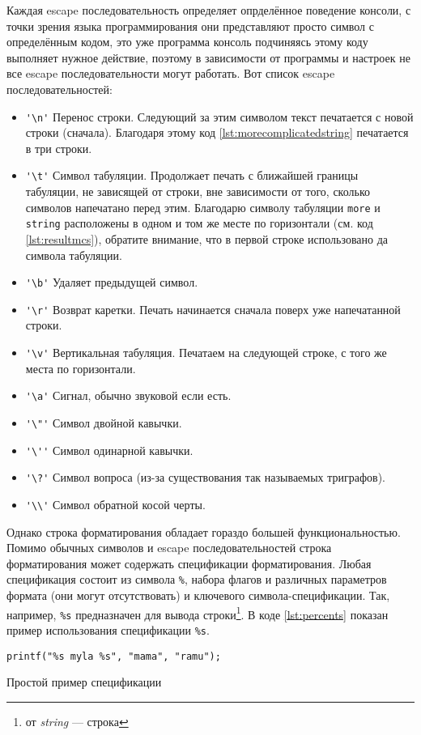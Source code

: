 \documentclass[12pt]{article}
\begin{document}
Каждая escape последовательность определяет опрделённое поведение консоли, с точки зрения языка программирования они представляют просто символ с определённым кодом, это уже программа консоль подчиняясь этому коду выполняет нужное действие, поэтому в зависимости от программы и настроек не все escape последовательности могут работать. Вот список escape последовательностей:
\begin{itemize}
 \item \verb|'\n'| Перенос строки. Следующий за этим символом текст печатается с новой строки (сначала). Благодаря этому код \ref{lst:morecomplicatedstring} печатается в три строки.
 \item \verb|'\t'| Символ табуляции. Продолжает печать с ближайшей границы табуляции, не зависящей от строки, вне зависимости от того, сколько символов напечатано перед этим. Благодарю символу табуляции \verb|more| и \verb|string| расположены в одном и том же месте по горизонтали (см. код \ref{lst:resultmcs}), обратите внимание, что в первой строке использовано да символа табуляции.
 \item \verb|'\b'| Удаляет предыдущей символ.
 \item \verb|'\r'| Возврат каретки. Печать начинается сначала поверх уже напечатанной строки.
 \item \verb|'\v'| Вертикальная табуляция. Печатаем на следующей строке, с того же места по горизонтали.
 \item \verb|'\a'| Сигнал, обычно звуковой если есть.
 \item \verb|'\"'| Символ двойной кавычки.
 \item \verb|'\''| Символ одинарной кавычки.
 \item \verb|'\?'| Символ вопроса (из-за существования так называемых триграфов).
 \item \verb|'\\'| Символ обратной косой черты.
\end{itemize}

Однако строка форматирования обладает гораздо большей функциональностью. Помимо обычных символов и escape последовательностей строка форматирования может содержать спецификации форматирования. Любая спецификация состоит из символа \verb|%|, набора флагов и различных параметров формата (они могут отсутствовать) и ключевого символа-спецификации. Так, например, \verb|%s| предназначен для вывода строки\footnote{от \textit{string} --- строка}. В коде \ref{lst:percents} показан пример использования спецификации \verb|%s|.
\begin{listing}[ht]
\begin{center}
\begin{verbatim}
printf("%s myla %s", "mama", "ramu");
\end{verbatim}
\end{center}
\caption{Простой пример спецификации}
\label{lst:percents}
\end{listing}
\end{document}
